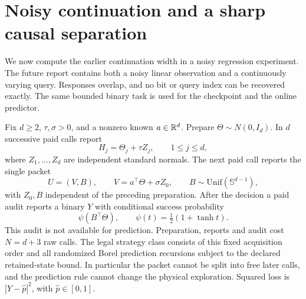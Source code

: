 \section{Noisy continuation and a sharp causal separation}\label{sec:noisy}
We now compute the earlier continuation width in a noisy regression experiment. The future report contains both a noisy linear observation and a continuously varying query. Responses overlap, and no bit or query index can be recovered exactly. The same bounded binary task is used for the checkpoint and the online predictor.

Fix $d\ge2$, $\tau,\sigma>0$, and a nonzero known $a\in\mathbb R^d$. Prepare $\Theta\sim N(0,I_d)$. In $d$ successive paid calls report
\begin{equation}\label{eq:noisyprefix}
 H_j=\Theta_j+\tau Z_j,\qquad 1\le j\le d,
\end{equation}
where $Z_1,\ldots,Z_d$ are independent standard normals. The next paid call reports the single packet
\begin{equation}\label{eq:noisypacket}
 U=(V,B),\qquad V=a^\top\Theta+\sigma Z_0,
 \qquad B\sim\mathrm{Unif}(\mathbb S^{d-1}),
\end{equation}
with $Z_0,B$ independent of the preceding preparation. After the decision a paid audit reports a binary $Y$ with conditional success probability
\[
 \psi(B^\top\Theta),\qquad \psi(t)=\tfrac12(1+\tanh t).
\]
This audit is not available for prediction. Preparation, reports and audit cost $N=d+3$ raw calls. The legal strategy class consists of this fixed acquisition order and all randomized Borel prediction recursions subject to the declared retained-state bound. In particular the packet cannot be split into free later calls, and the prediction rule cannot change the physical exploration. Squared loss is $|Y-\widehat p|^2$, with $\widehat p\in[0,1]$.

